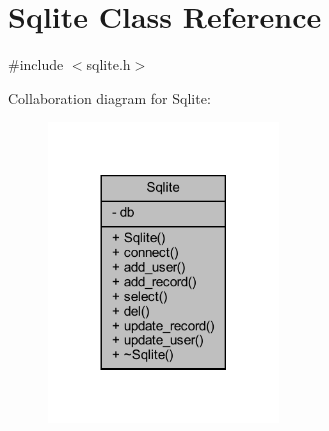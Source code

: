 \hypertarget{class_sqlite}{}\section{Sqlite Class Reference}
\label{class_sqlite}


{\ttfamily \#include $<$sqlite.\+h$>$}



Collaboration diagram for Sqlite\+:
\nopagebreak
\begin{figure}[H]
\begin{center}
\leavevmode
\includegraphics[width=173pt]{class_sqlite__coll__graph}
\end{center}
\end{figure}
